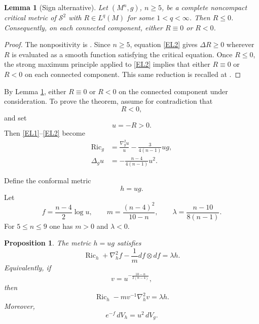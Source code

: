 \documentclass[11pt]{amsart}
\numberwithin{equation}{section}
\newtheorem{proposition}[theorem]{Proposition}
\newtheorem{lemma}[theorem]{Lemma}
\DeclareMathOperator{\Ric}{Ric}
\newcommand{\Hess}{\nabla^2}
\begin{document}
\begin{lemma}[Sign alternative]\label{lem:sign}
Let $(M^n,g)$, $n\geq 5$, be a complete noncompact critical metric of $\mathcal S^2$ with $R\in L^q(M)$ for some $1<q<\infty$.  Then $R\leq0$.  Consequently, on each connected component, either $R\equiv0$ or $R<0$.
\end{lemma}

\begin{proof}
The nonpositivity is \cite[Lemma~5.1]{CMM2023}.  Since $n\ge5$, equation \eqref{EL2} gives $\Delta R\ge0$ wherever $R$ is evaluated as a smooth function satisfying the critical equation.  Once $R\le0$, the strong maximum principle applied to \eqref{EL2} implies that either $R\equiv0$ or $R<0$ on each connected component.  This same reduction is recalled at \cite[Section~2]{CMM2026}.
\end{proof}

By Lemma \ref{lem:sign}, either $R\equiv0$ or $R<0$ on the connected component under consideration.  To prove the theorem, assume for contradiction that
$$
        R<0,
$$
and set
$$
        u=-R>0.
$$
Then \eqref{EL1}--\eqref{EL2} become
\begin{align}
        \Ric_g &= \frac{\Hess_g u}{u}-\frac{3}{4(n-1)}u g, \label{uRic}\\
        \Delta_g u &= -\frac{n-4}{4(n-1)}u^2 . \label{uLap}
\end{align}

Define the conformal metric
\begin{equation}\label{hdef}
        h=u g.
\end{equation}
Let
\begin{equation}\label{fmdef}
        f=\frac{n-4}{2}\log u,
        \qquad
        m=\frac{(n-4)^2}{10-n},
        \qquad
        \lambda=\frac{n-10}{8(n-1)} .
\end{equation}
For $5\leq n\leq 9$ one has $m>0$ and $\lambda<0$.

\begin{proposition}\label{prop:QE}
The metric $h=ug$ satisfies
\begin{equation}\label{QE-f}
        \Ric_h+\Hess_h f-\frac1m df\otimes df=\lambda h.
\end{equation}
Equivalently, if
\begin{equation}\label{vdef}
        v=u^{-\frac{10-n}{2(n-4)}},
\end{equation}
then
\begin{equation}\label{QE-v}
        \Ric_h-m v^{-1}\Hess_h v=\lambda h.
\end{equation}
Moreover,
\begin{equation}\label{weighted-volume}
        e^{-f}\,dV_h=u^2\,dV_g .
\end{equation}
\end{proposition}
\end{document}
